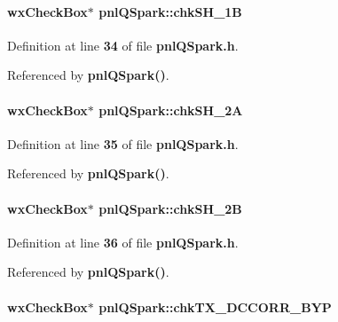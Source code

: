 \paragraph[{chk\+S\+H\+\_\+1B}]{\setlength{\rightskip}{0pt plus 5cm}wx\+Check\+Box$\ast$ pnl\+Q\+Spark\+::chk\+S\+H\+\_\+1B}\label{classpnlQSpark_a7ecaabadb7cdd8fbe3410e6fcd6bb7b1}


Definition at line {\bf 34} of file {\bf pnl\+Q\+Spark.\+h}.



Referenced by {\bf pnl\+Q\+Spark()}.

\paragraph[{chk\+S\+H\+\_\+2A}]{\setlength{\rightskip}{0pt plus 5cm}wx\+Check\+Box$\ast$ pnl\+Q\+Spark\+::chk\+S\+H\+\_\+2A}\label{classpnlQSpark_ad9f32aa4525a6356742d2de672b62d2f}


Definition at line {\bf 35} of file {\bf pnl\+Q\+Spark.\+h}.



Referenced by {\bf pnl\+Q\+Spark()}.

\paragraph[{chk\+S\+H\+\_\+2B}]{\setlength{\rightskip}{0pt plus 5cm}wx\+Check\+Box$\ast$ pnl\+Q\+Spark\+::chk\+S\+H\+\_\+2B}\label{classpnlQSpark_aecb0f3b2b730f93683459b082dccc7dc}


Definition at line {\bf 36} of file {\bf pnl\+Q\+Spark.\+h}.



Referenced by {\bf pnl\+Q\+Spark()}.

\paragraph[{chk\+T\+X\+\_\+\+D\+C\+C\+O\+R\+R\+\_\+\+B\+YP}]{\setlength{\rightskip}{0pt plus 5cm}wx\+Check\+Box$\ast$ pnl\+Q\+Spark\+::chk\+T\+X\+\_\+\+D\+C\+C\+O\+R\+R\+\_\+\+B\+YP}\label{classpnlQSpark_af2148f915b988a8e01b874ff568ef6f6}


